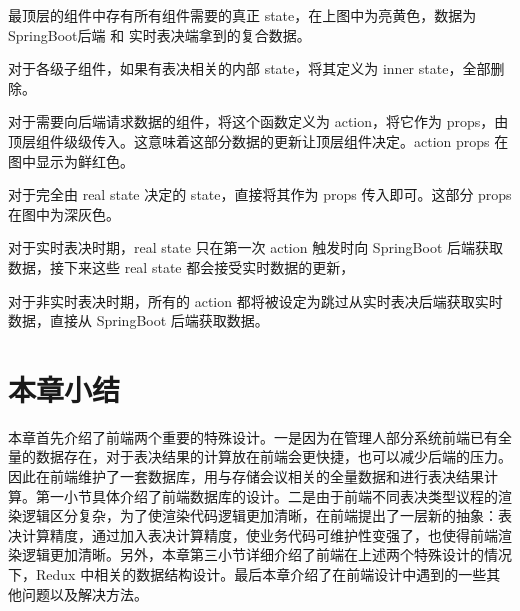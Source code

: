   最顶层的组件中存有所有组件需要的真正 state，在上图中为亮黄色，数据为 SpringBoot后端 和 实时表决端拿到的复合数据。

  对于各级子组件，如果有表决相关的内部 state，将其定义为 inner state，全部删除。

  对于需要向后端请求数据的组件，将这个函数定义为 action，将它作为 props，由顶层组件级级传入。这意味着这部分数据的更新让顶层组件决定。action props 在图中显示为鲜红色。

  对于完全由 real state 决定的 state，直接将其作为 props 传入即可。这部分 props 在图中为深灰色。

对于实时表决时期，real state 只在第一次 action 触发时向 SpringBoot 后端获取数据，接下来这些 real state 都会接受实时数据的更新，

对于非实时表决时期，所有的 action 都将被设定为跳过从实时表决后端获取实时数据，直接从 SpringBoot 后端获取数据。

\section{本章小结}
本章首先介绍了前端两个重要的特殊设计。一是因为在管理人部分系统前端已有全量的数据存在，对于表决结果的计算放在前端会更快捷，也可以减少后端的压力。因此在前端维护了一套数据库，用与存储会议相关的全量数据和进行表决结果计算。第一小节具体介绍了前端数据库的设计。二是由于前端不同表决类型议程的渲染逻辑区分复杂，为了使渲染代码逻辑更加清晰，在前端提出了一层新的抽象：表决计算精度，通过加入表决计算精度，使业务代码可维护性变强了，也使得前端渲染逻辑更加清晰。另外，本章第三小节详细介绍了前端在上述两个特殊设计的情况下，Redux 中相关的数据结构设计。最后本章介绍了在前端设计中遇到的一些其他问题以及解决方法。